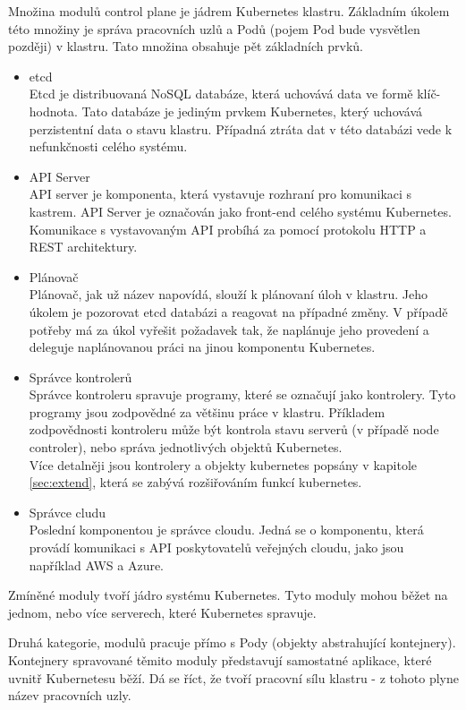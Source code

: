 Množina modulů control plane je jádrem Kubernetes klastru. Základním úkolem této množiny je správa pracovních uzlů a Podů (pojem Pod bude vysvětlen později) v klastru.\cite{thekubernetesauthors_2022_kubernetes} Tato množina obsahuje pět základních prvků.
\begin{itemize}
    \item etcd\\
    Etcd je distribuovaná NoSQL databáze, která uchovává data  ve formě klíč-hodnota. Tato databáze je jediným prvkem Kubernetes, který uchovává perzistentní data o stavu klastru. Případná ztráta dat v této databázi vede k nefunkčnosti celého systému.
    \item API Server\\
    API server je komponenta, která vystavuje rozhraní pro komunikaci s kastrem. API Server je označován jako front-end celého systému Kubernetes. Komunikace s vystavovaným API probíhá za pomocí protokolu HTTP a REST architektury. 
    \item Plánovač\\
    Plánovač, jak už název napovídá, slouží k plánovaní úloh v klastru. Jeho úkolem je pozorovat etcd databázi a reagovat na případné změny. V případě potřeby má za úkol vyřešit požadavek tak, že naplánuje jeho provedení a deleguje naplánovanou práci na jinou komponentu Kubernetes.  
    \item Správce kontrolerů\\
    Správce kontroleru spravuje programy, které se označují jako kontrolery. Tyto programy jsou zodpovědné za většinu práce v klastru. Příkladem zodpovědnosti kontroleru může být kontrola stavu serverů (v případě node controler), nebo správa jednotlivých objektů Kubernetes.\\
    Více detalněji jsou kontrolery a objekty kubernetes popsány v kapitole \ref{sec:extend}, která se zabývá rozšiřováním funkcí kubernetes. 
    \item Správce cludu\\
    Poslední komponentou je správce cloudu. Jedná se o komponentu, která provádí komunikaci s API poskytovatelů veřejných cloudu, jako jsou například AWS a Azure. 
\end{itemize}
Zmíněné moduly tvoří jádro systému Kubernetes. Tyto moduly mohou běžet na jednom, nebo více serverech, které Kubernetes spravuje.

Druhá kategorie, modulů pracuje přímo s Pody (objekty abstrahující kontejnery). Kontejnery spravované těmito moduly představují samostatné aplikace, které uvnitř Kubernetesu běží. Dá se říct, že tvoří pracovní sílu klastru - z tohoto plyne název pracovních uzly.

